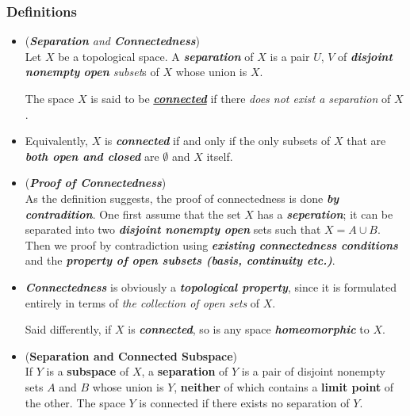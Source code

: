 \documentclass[11pt]{article}
\begin{document}
\subsubsection{Definitions}
\begin{itemize}
\item \begin{definition}(\emph{\textbf{Separation} and \textbf{Connectedness}})\\
Let $X$ be a topological space. A \emph{\textbf{separation}} of $X$ is a pair $U$, $V$ of \emph{\textbf{disjoint} \textbf{nonempty} \textbf{open} subset}s of $X$ whose union is $X$. 

The space $X$ is said to be \underline{\emph{\textbf{connected}}} if there \emph{does not exist a separation} of $X$.
\end{definition}

\item  \begin{definition} 
Equivalently, $X$ is \emph{\textbf{connected}} if and only if the only subsets of $X$ that are \emph{\textbf{both open and closed}} are $\emptyset$
and $X$ itself.
\end{definition}

\item \begin{remark} (\emph{\textbf{Proof of Connectedness}})\\
As the definition suggests, the proof of connectedness is done \emph{\textbf{by contradition}}. One first assume that the set $X$ has a \emph{\textbf{seperation}}; it can be separated into two \emph{\textbf{disjoint nonempty open}} sets such that $X = A \cup B$. Then we proof by contradiction using \emph{\textbf{existing connectedness conditions}} and the \emph{\textbf{property of open subsets (basis, continuity etc.)}}.
\end{remark}

\item \begin{remark}
\emph{\textbf{Connectedness}} is obviously a \emph{\textbf{topological property}}, since it is formulated entirely in terms of \emph{the collection of open sets} of $X$. 

Said differently, if $X$ is \emph{\textbf{connected}}, so is any space \emph{\textbf{homeomorphic}} to $X$.
\end{remark}

\item \begin{lemma}(\textbf{Separation and Connected Subspace}) \citep{munkres2000topology}\\
If $Y$ is a \textbf{subspace} of $X$, a \textbf{separation} of $Y$ is a pair of disjoint nonempty sets $A$ and $B$ whose union is $Y$, \textbf{neither} of which contains a \textbf{limit point} of the other. The space $Y$ is connected if there exists no separation of $Y$.
\end{lemma}


\end{itemize}
\end{document}
